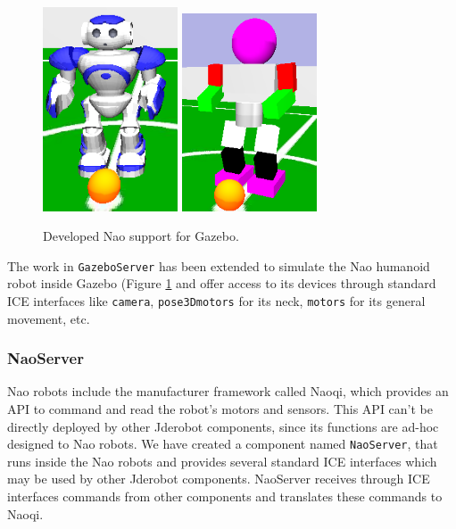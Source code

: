 \documentclass[twocolumn]{svjour3}          %
\begin{document}
\begin{figure}[h!]
  \includegraphics[width=4cm]{figs/nao_piel.png}
  \includegraphics[width=4cm]{figs/nao_sinPiel.png}
\caption{Developed Nao support for Gazebo.}
\label{fig:naogazebo}
\end{figure}

The work in \texttt{GazeboServer} has been extended to simulate the Nao humanoid robot inside Gazebo (Figure \ref{fig:naogazebo} and offer access to its devices through standard ICE interfaces like \texttt{camera}, \texttt{pose3Dmotors} for its neck, \texttt{motors} for its general movement, etc.

\subsubsection{NaoServer}

Nao robots include the manufacturer framework called Naoqi, which provides an API to command and read the robot's motors and sensors. This API can't be directly deployed by other Jderobot components, since its functions are ad-hoc designed to Nao robots. We have created a component named \texttt{NaoServer}, that runs inside the Nao robots and provides several standard ICE interfaces which may be used by other Jderobot components. NaoServer receives through ICE interfaces commands from other components and translates these commands to Naoqi.
\end{document}
